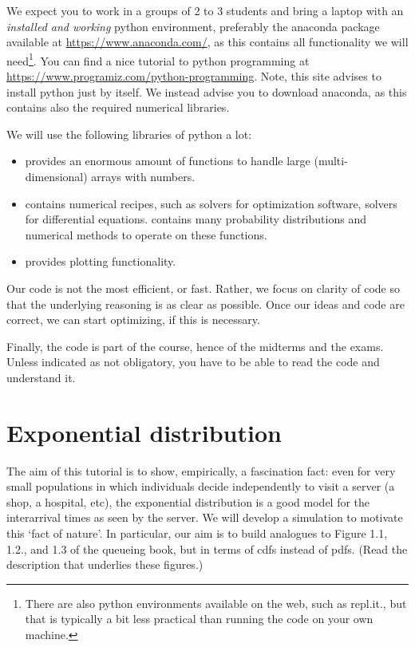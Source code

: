 \documentclass{scrartcl}
\begin{document}
We expect you to work in a groups of 2 to 3 students and bring a laptop with an \emph{installed and working} python environment, preferably  the anaconda package available at \url{https://www.anaconda.com/}, as this contains all functionality we will need\footnote{There are also python environments available on the web, such as repl.it., but that is typically a bit less practical than running the code on your own machine.}. You can find a nice tutorial to python programming at  \url{https://www.programiz.com/python-programming}. Note, this site advises to install python just by itself. We instead advise you to download anaconda, as this contains also the required numerical libraries. 

We will use the following libraries of python a lot:
\begin{itemize}
\item {}  provides an enormous amount of functions to handle large (multi-dimensional) arrays with numbers. 
\item {} contains numerical recipes, such as solvers for optimization software, solvers for differential equations.  contains many probability distributions and numerical methods to operate on these functions. 
\item {} provides plotting functionality.
\end{itemize}

Our code is not the most efficient, or fast. Rather, we focus on clarity of code so that the underlying reasoning is as clear as possible. Once our ideas and code are correct, we can start optimizing, if this is necessary. 

Finally, the code is part of the course, hence of the midterms and the exams.  Unless indicated as not obligatory, you have to be able to read the code and understand it.


\clearpage
\section{Exponential distribution}

The aim of this tutorial is to show, empirically, a fascination fact: even for very small populations in which individuals decide independently to visit a server (a shop, a hospital, etc),  the  exponential distribution is a good model for the interarrival times as seen by the server.  We will develop a simulation to motivate this `fact of nature'.  In particular, our aim is to build analogues to Figure 1.1, 1.2., and 1.3 of the queueing book, but in terms of cdfs instead of pdfs. (Read the description that underlies these figures.)
\end{document}
